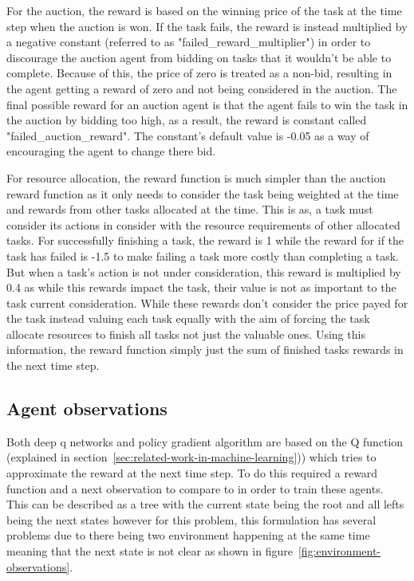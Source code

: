 For the auction, the reward is based on the winning price of the task at the time step when the auction is won. If the
task fails, the reward is instead multiplied by a negative constant (referred to as "failed_reward_multiplier") in
order to discourage the auction agent from bidding on tasks that it wouldn't be able to complete. Because of this,
the price of zero is treated as a non-bid, resulting in the agent getting a reward of zero and not being considered in
the auction. The final possible reward for an auction agent is that the agent fails to win the task in the auction by
bidding too high, as a result, the reward is constant called "failed_auction_reward". The constant's default value is
-0.05 as a way of encouraging the agent to change there bid.

For resource allocation, the reward function is much simpler than the auction reward function as it only needs to
consider the task being weighted at the time and rewards from other tasks allocated at the time. This is as,
a task must consider its actions in consider with the resource requirements of other allocated tasks. For successfully
finishing a task, the reward is 1 while the reward for if the task has failed is -1.5 to make failing a task more
costly than completing a task. But when a task's action is not under consideration, this reward is multiplied by
0.4 as while this rewards impact the task, their value is not as important to the task current consideration.
While these rewards don't consider the price payed for the task instead valuing each task equally with the aim of
forcing the task allocate resources to finish all tasks not just the valuable ones. Using this information, the reward
function simply just the sum of finished tasks rewards in the next time step.

\subsection{Agent observations}\label{subsec:agent-observations}
Both deep q networks and policy gradient algorithm are based on the Q function (explained in
section~\ref{sec:related-work-in-machine-learning})) which tries to approximate the reward at the next time step. To do
this required a reward function and a next observation to compare to in order to train these agents. This can be
described as a tree with the current state being the root and all lefts being the next states however for this problem,
this formulation has several problems due to there being two environment happening at the same time meaning that the
next state is not clear as shown in figure~\ref{fig:environment-observations}.

